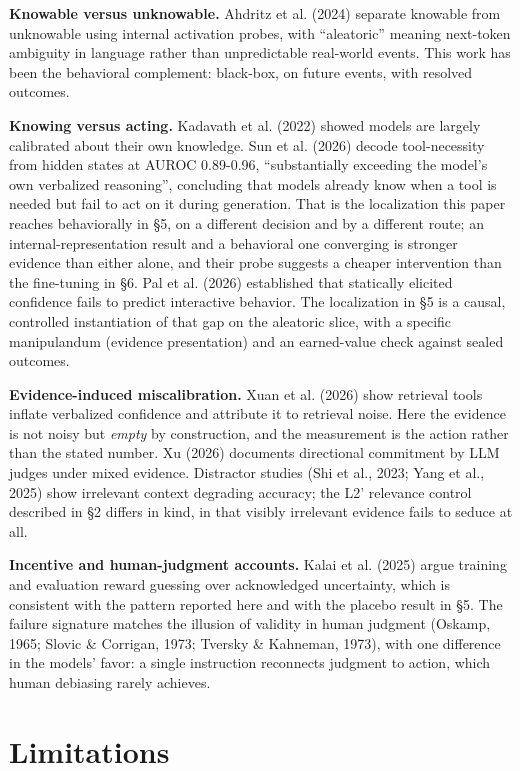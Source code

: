\documentclass[10pt]{article}
\begin{document}
\textbf{Knowable versus unknowable.} Ahdritz et al. (2024) separate knowable from unknowable using internal activation probes, with ``aleatoric'' meaning next-token ambiguity in language rather than unpredictable real-world events. This work has been the behavioral complement: black-box, on future events, with resolved outcomes.

\textbf{Knowing versus acting.} Kadavath et al. (2022) showed models are largely calibrated about their own knowledge. Sun et al. (2026) decode tool-necessity from hidden states at AUROC 0.89-0.96, ``substantially exceeding the model's own verbalized reasoning'', concluding that models already know when a tool is needed but fail to act on it during generation. That is the localization this paper reaches behaviorally in \S5, on a different decision and by a different route; an internal-representation result and a behavioral one converging is stronger evidence than either alone, and their probe suggests a cheaper intervention than the fine-tuning in \S6. Pal et al. (2026) established that statically elicited confidence fails to predict interactive behavior. The localization in \S5 is a causal, controlled instantiation of that gap on the aleatoric slice, with a specific manipulandum (evidence presentation) and an earned-value check against sealed outcomes.

\textbf{Evidence-induced miscalibration.} Xuan et al. (2026) show retrieval tools inflate verbalized confidence and attribute it to retrieval noise. Here the evidence is not noisy but \textit{empty} by construction, and the measurement is the action rather than the stated number. Xu (2026) documents directional commitment by LLM judges under mixed evidence. Distractor studies (Shi et al., 2023; Yang et al., 2025) show irrelevant context degrading accuracy; the L2' relevance control described in \S2 differs in kind, in that visibly irrelevant evidence fails to seduce at all.

\textbf{Incentive and human-judgment accounts.} Kalai et al. (2025) argue training and evaluation reward guessing over acknowledged uncertainty, which is consistent with the pattern reported here and with the placebo result in \S5. The failure signature matches the illusion of validity in human judgment (Oskamp, 1965; Slovic \& Corrigan, 1973; Tversky \& Kahneman, 1973), with one difference in the models' favor: a single instruction reconnects judgment to action, which human debiasing rarely achieves.

\FloatBarrier
\section{Limitations}
\end{document}
